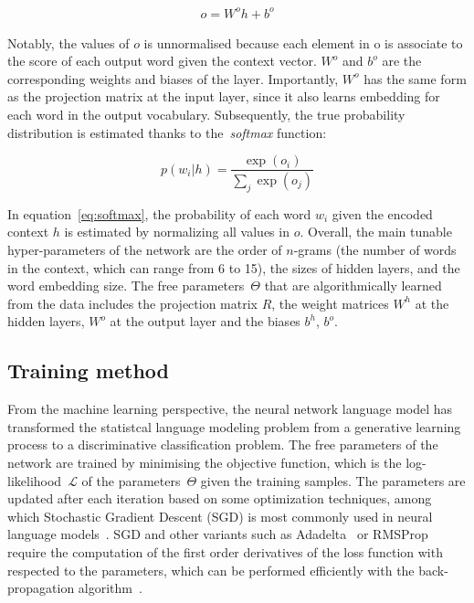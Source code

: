 \begin{equation}
\begin{aligned}
o = W^o h + b^o
\label{eq:linearoutput}
\end{aligned}  
\end{equation}

Notably, the values of $o$ is unnormalised because each element in o is associate to the score of each output word given the context vector. $W^o$ and $b^o$ are the corresponding weights and biases of the layer. Importantly, $W^o$ has the same form as the projection matrix at the input layer, since it also learns embedding for each word in the output vocabulary. Subsequently, the true probability distribution is estimated thanks to the~\textit{softmax} function:

\begin{equation}
p(w_i | h) = \frac{\exp(o_i)}{\sum_j \exp(o_j)}
\label{eq:softmax}
\end{equation}

In equation~\ref{eq:softmax}, the probability of each word $w_i$ given the encoded context $h$ is estimated by normalizing all values in $o$. Overall, the main tunable hyper-parameters of the network are the order of $n$-grams (the number of words in the context, which can range from 6 to 15), the sizes of hidden layers, and the word embedding size. The free parameters~$\Theta$ that are algorithmically learned from the data includes the projection matrix $R$, the weight matrices $W^h$ at the hidden layers, $W^o$ at the output layer and the biases $b^h$, $b^o$. 


\subsection{Training method}
From the machine learning perspective, the neural network language model has transformed the statistcal language modeling problem from a generative learning process to a discriminative classification problem. The free parameters of the network are trained by minimising the objective function, which is the log-likelihood~$\mathcal{L}$ of the  parameters~$\Theta$ given the training samples. The parameters are updated after each iteration based on some optimization techniques, among which Stochastic Gradient Descent (SGD) is most commonly used in neural language models~\cite{zaremba2014recurrent,le2011structured,mikolov2010recurrent}. SGD and other variants such as Adadelta~\cite{zeiler2012adadelta} or RMSProp~\cite{tieleman2012lecture} require the computation of the first order derivatives of the loss function with respected to the parameters, which can be performed efficiently with the back-propagation algorithm~\cite{le1990handwritten}.

